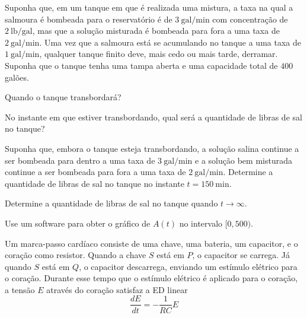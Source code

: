 \documentclass[oneside,12pt,a4paper]{report}
\begin{document}
     Suponha que, em um tanque em que é realizada uma mistura, a taxa na qual a salmoura é bombeada para o reservatório é de $3~\mathrm{gal/min}$ com concentração de $2~\mathrm{lb/gal}$, mas que a solução misturada é bombeada para fora a uma taxa de $2~\mathrm{gal/min}$. Uma vez que a salmoura está se acumulando no tanque a uma taxa de $1~\mathrm{gal/min}$, qualquer tanque finito deve, mais cedo ou mais tarde, derramar. Suponha que o tanque tenha uma tampa aberta e uma capacidade total de $400$ galões.
    \begin{itensquestao}[1]
        \item Quando o tanque transbordará?
        \item No instante em que estiver transbordando, qual será a quantidade de libras de sal no tanque?
        \item Suponha que, embora o tanque esteja transbordando, a solução salina continue a ser bombeada para dentro a uma taxa de $3~\mathrm{gal/min}$ e a solução bem misturada continue a ser bombeada para fora a uma taxa de $2~\mathrm{gal/min}$. Determine a quantidade de libras de sal no tanque no instante $t=150~\mathrm{min}$.
        \item Determine a quantidade de libras de sal no tanque quando $t\to\infty$.
        \item Use um software para obter o gráfico de $A(t)$ no intervalo $[0,500)$.
    \end{itensquestao}

    \begin{resolucao}
        
    \end{resolucao}

     Um marca-passo cardíaco consiste de uma chave, uma bateria, um capacitor, e o coração como resistor. Quando a chave $S$ está em $P$, o capacitor se carrega. Já quando $S$ está em $Q$, o capacitor descarrega, enviando um estímulo elétrico para o coração. Durante esse tempo que o estímulo elétrico é aplicado para o coração, a tensão $E$ através do coração satisfaz a ED linear
    \[\frac{dE}{dt}=-\frac{1}{RC}E\]
\end{document}
